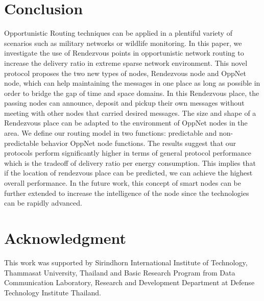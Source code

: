 \documentclass[conference]{IEEEtran}
\begin{document}
\section{Conclusion}

Opportunistic Routing techniques can be applied in a plentiful variety of scenarios such as military networks or wildlife monitoring. 
%
In this paper, we investigate the use of Rendezvous points in opportunistic network routing to increase the delivery ratio in extreme sparse network environment.
%
This novel protocol proposes the two new types of nodes, Rendezvous node and OppNet node, which can help maintaining the messages in one place as long as possible in order to bridge the gap of time and space domains.
%
In this Rendezvous place, the passing nodes can announce, deposit and pickup their own messages without meeting with other nodes that carried desired messages.
%
The size and shape of a Rendezvous place can be adapted to the environment of OppNet nodes in the area.
%
We define our routing model in two functions: predictable  and non-predictable behavior OppNet node functions.
%
The results suggest that our protocols perform significantly higher in terms of general protocol performance which is the tradeoff of delivery ratio per energy consumption.
%
This implies that if the location of rendezvous place can be predicted, we can achieve the highest overall performance.
In the future work, this concept of smart nodes can be further extended to increase the intelligence of the node since the technologies can be rapidly advanced.

\section*{Acknowledgment}

This work was supported by Sirindhorn International Institute of Technology, Thammasat University, Thailand and Basic Research Program from Data Communication Laboratory, Research and Development Department at Defense Technology Institute Thailand.



\end{document}
